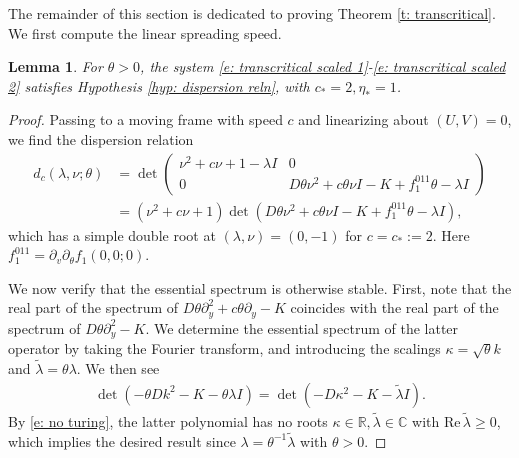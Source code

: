 \documentclass[11pt]{article}
\newcommand{\R}{\mathbb{R}}
\newcommand{\C}{\mathbb{C}}
\renewcommand{\Re}{\mathrm{Re} \,}
\newtheorem{lemma}[prop]{Lemma}
\numberwithin{equation}{section}
\numberwithin{prop}{section}
\begin{document}
The remainder of this section is dedicated to proving Theorem \ref{t: transcritical}. We first compute the linear spreading speed.
\begin{lemma} \label{l: transcrit hyp 1}
	For $\theta > 0$, the system \eqref{e: transcritical scaled 1}-\eqref{e: transcritical scaled 2} satisfies Hypothesis \ref{hyp: dispersion reln}, with $c_* = 2, \eta_* = 1$. 
\end{lemma}
\begin{proof}
	Passing to a moving frame with speed $c$ and linearizing about $(U,V) = 0$, we find the dispersion relation
	\begin{align}
		d_c (\lambda, \nu; \theta) &= \det \begin{pmatrix}
			\nu^2 + c \nu + 1 - \lambda I & 0 \\
			0 & D \theta \nu^2 + c \theta \nu I -  K + f_1^{011} \theta - \lambda I
		\end{pmatrix} \\
		&= (\nu^2 + c \nu + 1) \det (D \theta \nu^2 + c \theta \nu I -  K + f_1^{011} \theta - \lambda I),
	\end{align}
	which has a simple double root at $(\lambda, \nu) = (0, -1)$ for $c = c_* := 2$. Here $f_1^{011} = \partial_v \partial_\theta f_1 (0,0;0)$. 
	
	We now verify that the essential spectrum is otherwise stable. First, note that the real part of the spectrum of $D \theta \partial_y^2 + c \theta \partial_y - K$ coincides with the real part of the spectrum of $D \theta \partial_y^2 - K$. We determine the essential spectrum of the latter operator by taking the Fourier transform, and introducing the scalings $\kappa = \sqrt{\theta} k$ and $\tilde{\lambda} = \theta \lambda$. We then see
	\begin{align}
		\det (- \theta D k^2 - K - \theta \lambda I) = \det (- D \kappa^2 - K - \tilde{\lambda} I). 
	\end{align}
	By \eqref{e: no turing}, the latter polynomial has no roots $\kappa \in \R, \tilde{\lambda} \in \C$ with $\Re \tilde{\lambda} \geq 0$, which implies the desired result since $\lambda = \theta^{-1} \tilde{\lambda}$ with $\theta > 0$. 
\end{proof}
\end{document}

